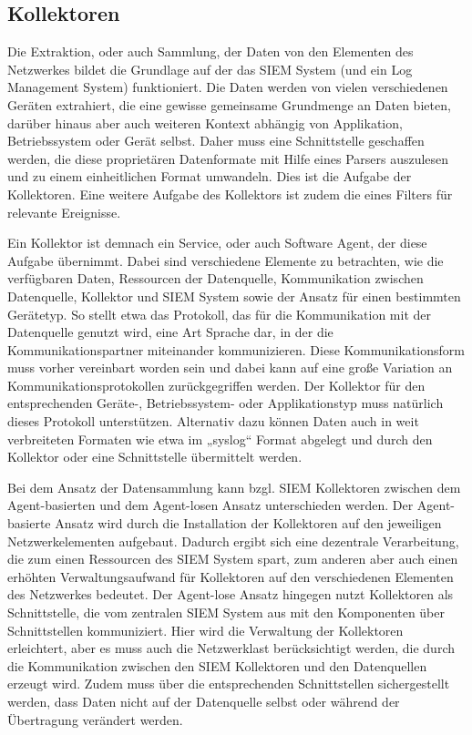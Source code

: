 \subsection{Kollektoren}
Die Extraktion, oder auch Sammlung, der Daten von den Elementen des Netzwerkes bildet die Grundlage auf der das SIEM System (und ein Log Management System) funktioniert. Die Daten werden von vielen verschiedenen Geräten extrahiert, die eine gewisse gemeinsame Grundmenge an Daten bieten, darüber hinaus aber auch weiteren Kontext abhängig von Applikation, Betriebssystem oder Gerät selbst. Daher muss eine Schnittstelle geschaffen werden, die diese proprietären Datenformate mit Hilfe eines Parsers auszulesen und zu einem einheitlichen Format umwandeln. %
Dies ist die Aufgabe der Kollektoren. Eine weitere Aufgabe des Kollektors ist zudem die eines Filters für relevante Ereignisse. 

Ein Kollektor ist demnach ein Service, oder auch Software Agent, der diese Aufgabe übernimmt. Dabei sind verschiedene Elemente zu betrachten, wie die verfügbaren Daten, Ressourcen der Datenquelle, Kommunikation zwischen Datenquelle, Kollektor und SIEM System sowie der Ansatz für einen bestimmten Gerätetyp. So stellt etwa das Protokoll, das für die Kommunikation mit der Datenquelle genutzt wird, eine Art Sprache dar, in der die Kommunikationspartner miteinander kommunizieren. Diese Kommunikationsform muss vorher vereinbart worden sein und dabei kann auf eine große Variation an Kommunikationsprotokollen zurückgegriffen werden. Der Kollektor für den entsprechenden Geräte-, Betriebssystem- oder Applikationstyp muss natürlich dieses Protokoll unterstützen. Alternativ dazu können Daten auch in weit verbreiteten Formaten wie etwa im „syslog“ Format abgelegt und durch den Kollektor oder eine Schnittstelle übermittelt werden.

Bei dem Ansatz der Datensammlung kann bzgl. SIEM Kollektoren zwischen dem Agent-basierten und dem Agent-losen Ansatz unterschieden werden. Der Agent-basierte Ansatz wird durch die Installation der Kollektoren auf den jeweiligen Netzwerkelementen aufgebaut. Dadurch ergibt sich eine dezentrale Verarbeitung, die zum einen Ressourcen des SIEM System spart, zum anderen aber auch einen erhöhten Verwaltungsaufwand für Kollektoren auf den verschiedenen Elementen des Netzwerkes bedeutet. Der Agent-lose Ansatz hingegen nutzt Kollektoren als Schnittstelle, die vom zentralen SIEM System aus mit den Komponenten über Schnittstellen kommuniziert. Hier wird die Verwaltung der Kollektoren erleichtert, aber es muss auch die Netzwerklast berücksichtigt werden, die durch die Kommunikation zwischen den SIEM Kollektoren und den Datenquellen erzeugt wird. Zudem muss über die entsprechenden Schnittstellen sichergestellt werden, dass Daten nicht auf der Datenquelle selbst oder während der Übertragung verändert werden.

